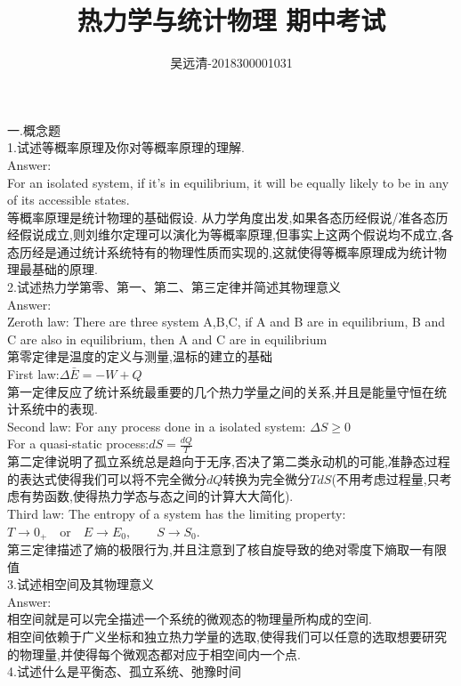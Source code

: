 \documentclass[UTF8]{ctexart}
\title{热力学与统计物理 期中考试}
\author{吴远清-2018300001031}
\begin{document}
    \maketitle
    一.概念题\\
    1.试述等概率原理及你对等概率原理的理解.\\
    Answer:\\
    For an isolated system, if it's in equilibrium, it will be equally likely to be in any of its accessible states.\\
    等概率原理是统计物理的基础假设. 从力学角度出发,如果各态历经假说/准各态历经假说成立,则刘维尔定理可以演化为等概率原理,但事实上这两个假说均不成立,各态历经是通过统计系统特有的物理性质而实现的,这就使得等概率原理成为统计物理最基础的原理.\\
    2.试述热力学第零、第一、第二、第三定律并简述其物理意义\\
    Answer:\\
    Zeroth law: There are three system A,B,C, if A and B are in equilibrium, B and C are also in equilibrium, then A and C are in equilibrium\\
    第零定律是温度的定义与测量,温标的建立的基础\\
    First law:$\Delta \bar{E} = -W + Q$\\
    第一定律反应了统计系统最重要的几个热力学量之间的关系,并且是能量守恒在统计系统中的表现.\\
    Second law: For any process done in a isolated system: $\Delta S \geq 0$\\
    For a quasi-static process:$dS = \frac{dQ}{T}$\\
    第二定律说明了孤立系统总是趋向于无序,否决了第二类永动机的可能,准静态过程的表达式使得我们可以将不完全微分$dQ$转换为完全微分$TdS$(不用考虑过程量,只考虑有势函数,使得热力学态与态之间的计算大大简化).\\
    Third law: The entropy of a system has the limiting property:$T\to 0_{+}\quad \text{or} \quad E \to E_0,\qquad S \to S_0$.\\
    第三定律描述了熵的极限行为,并且注意到了核自旋导致的绝对零度下熵取一有限值\\
    3.试述相空间及其物理意义\\
    Answer:\\
    相空间就是可以完全描述一个系统的微观态的物理量所构成的空间.\\
    相空间依赖于广义坐标和独立热力学量的选取,使得我们可以任意的选取想要研究的物理量,并使得每个微观态都对应于相空间内一个点.\\
    4.试述什么是平衡态、孤立系统、弛豫时间\\
\end{document}
